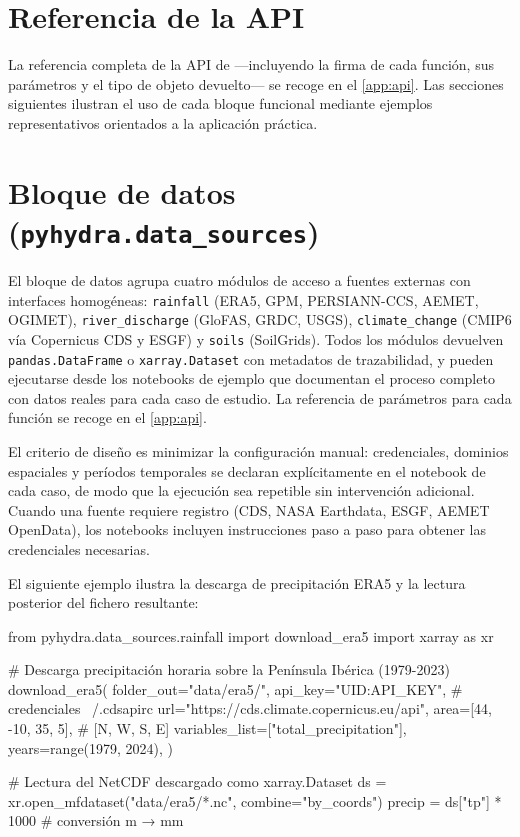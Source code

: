 \section{Referencia de la API}
\label{sec:manual_wiki_api}

La referencia completa de la API de \pyhydra ---incluyendo la firma de cada función, sus parámetros y el tipo de objeto devuelto--- se recoge en el \cref{app:api}. Las secciones siguientes ilustran el uso de cada bloque funcional mediante ejemplos representativos orientados a la aplicación práctica.

\section{Bloque de datos (\texttt{pyhydra.data\_sources})}

El bloque de datos agrupa cuatro módulos de acceso a fuentes externas con interfaces homogéneas: \texttt{rainfall} (ERA5, GPM, PERSIANN-CCS, AEMET, OGIMET), \texttt{river\_discharge} (GloFAS, GRDC, USGS), \texttt{climate\_change} (CMIP6 vía Copernicus CDS y ESGF) y \texttt{soils} (SoilGrids). Todos los módulos devuelven \texttt{pandas.DataFrame} o \texttt{xarray.Dataset} con metadatos de trazabilidad, y pueden ejecutarse desde los notebooks de ejemplo que documentan el proceso completo con datos reales para cada caso de estudio. La referencia de parámetros para cada función se recoge en el \cref{app:api}.

El criterio de diseño es minimizar la configuración manual: credenciales, dominios espaciales y períodos temporales se declaran explícitamente en el notebook de cada caso, de modo que la ejecución sea repetible sin intervención adicional. Cuando una fuente requiere registro (CDS, NASA Earthdata, ESGF, AEMET OpenData), los notebooks incluyen instrucciones paso a paso para obtener las credenciales necesarias.

El siguiente ejemplo ilustra la descarga de precipitación ERA5 y la lectura posterior del fichero resultante:

\begin{codeblock}
from pyhydra.data_sources.rainfall import download_era5
import xarray as xr

# Descarga precipitación horaria sobre la Península Ibérica (1979-2023)
download_era5(
    folder_out="data/era5/",
    api_key="UID:API_KEY",          # credenciales ~/.cdsapirc
    url="https://cds.climate.copernicus.eu/api",
    area=[44, -10, 35, 5],          # [N, W, S, E]
    variables_list=["total_precipitation"],
    years=range(1979, 2024),
)

# Lectura del NetCDF descargado como xarray.Dataset
ds = xr.open_mfdataset("data/era5/*.nc", combine="by_coords")
precip = ds["tp"] * 1000           # conversión m → mm
\end{codeblock}

